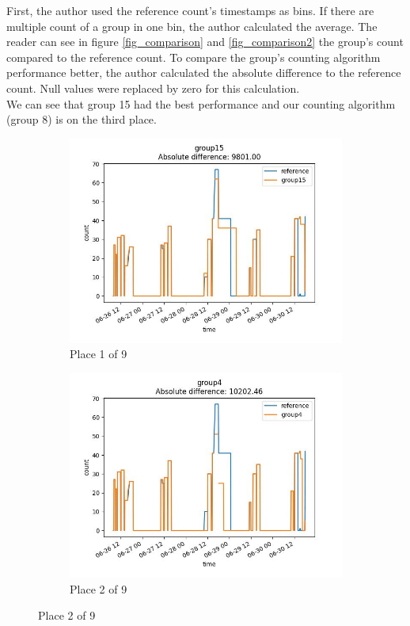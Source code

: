 First, the author used the reference count's timestamps as bins.
If there are multiple count of a group in one bin, the author calculated the average.
The reader can see in figure \ref{fig_comparison} and \ref{fig_comparison2} the group's count compared to the reference count.
To compare the group's counting algorithm performance better, the author calculated the absolute
difference to the reference count. Null values were replaced by zero for this calculation.\\
We can see that group 15 had the best performance and our counting algorithm (group 8) is on the
third place.

\begin{figure}
    \centering
    \begin{subfigure}[b]{0.45\textwidth}
        \includegraphics[width=\linewidth]{figures/ref-group15.jpeg}
        \caption{Place 1 of 9}
    \end{subfigure}
    \begin{subfigure}[b]{0.45\textwidth}
        \includegraphics[width=\linewidth]{figures/ref-group4.jpeg}
        \caption{Place 2 of 9}
    \end{subfigure}


\end{figure}
